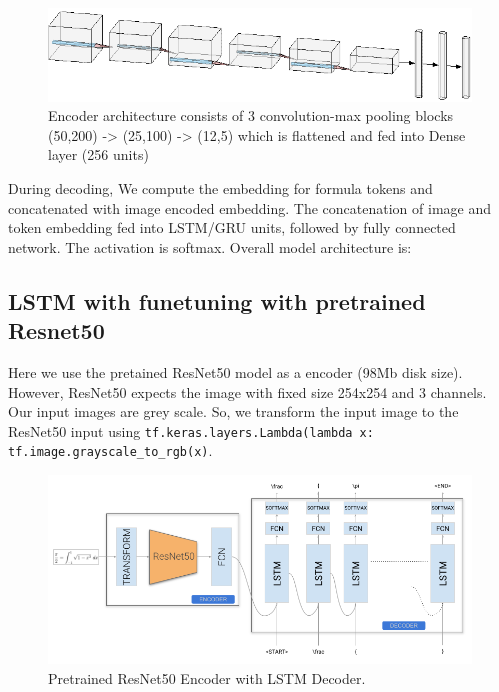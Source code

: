 \documentclass{article}
\begin{document}
\begin{figure}[H]
    \centering
    \includegraphics[scale=0.4]{cnn_architecture.png}
    \caption{Encoder architecture consists of 3 convolution-max pooling blocks (50,200) -> (25,100) -> (12,5) which is flattened and fed into Dense layer (256 units)  }	
    \label{fig:cnn_lstm}
\end{figure}

During decoding, We compute the embedding for formula tokens and concatenated with image encoded embedding. The concatenation of image and token embedding fed into LSTM/GRU units, followed by fully connected network. The activation is softmax.  Overall model architecture is: 

\subsection{LSTM with funetuning with pretrained Resnet50}

Here we use the pretained ResNet50 model as a encoder (98Mb disk size). However, ResNet50 expects the image with fixed size 254x254 and 3 channels. Our input images are grey scale. So, we transform the input image to the ResNet50 input using \verb|tf.keras.layers.Lambda(lambda x: tf.image.grayscale_to_rgb(x)|.


\begin{figure}[H]
    \centering
    \includegraphics[scale=0.3]{fig_resnet_LSTM.png}
    \caption{Pretrained ResNet50 Encoder with LSTM Decoder.}
    \label{fig:resnet_lstm}
\end{figure}
\end{document}
